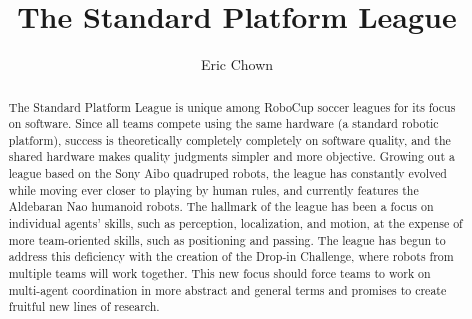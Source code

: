 \documentclass{llncs}
\begin{document}
\title{The Standard Platform League}




\author{ Eric Chown}





\maketitle

\begin{abstract}
The Standard Platform League is unique among RoboCup soccer leagues for
its focus on software. Since all teams compete using the same hardware (a standard robotic platform),
success is theoretically completely completely on software quality, and the shared hardware
makes quality judgments simpler and more objective. Growing out a league
based on the Sony Aibo quadruped robots, the league has constantly evolved while moving ever
closer to playing by human rules, and currently features the Aldebaran Nao humanoid robots. The hallmark of the league has been
a focus on individual agents' skills, such as perception, localization, and motion, at the expense
of more team-oriented skills, such as positioning and passing. The league has begun to address this deficiency
with the creation of the Drop-in Challenge, where robots
from multiple teams will work together. This new focus should force teams to work
on multi-agent coordination in more abstract and general terms and promises
to create fruitful new lines of research.
\end{abstract}
\end{document}
